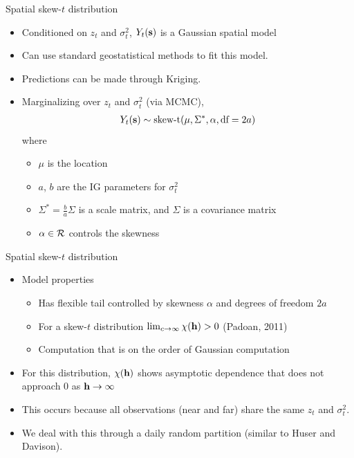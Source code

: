 \documentclass{beamer}
\begin{document}
\begin{frame}{Spatial skew-$t$ distribution}
  \begin{itemize} \setlength{\itemsep}{0.5em}
   \item \alert{Conditioned} on $z_t$ and $\sigma^2_t$, $Y_t(\mbox{\bf s})$ is a Gaussian spatial model
    \item Can use standard geostatistical methods to fit this model.
    \item Predictions can be made through Kriging.
    \item \alert{Marginalizing} over $z_t$ and $\sigma^2_t$ (via MCMC),
    \begin{align*}
      Y_t(\mbox{\bf s}) \sim \text{skew-t}(\mu, \Sigma^*, \alpha, \text{df}=2a)
    \end{align*}
    where
    \begin{itemize}
    	\item $\mu$ is the location
	\item $a$, $b$ are the IG parameters for $\sigma^2_t$
	\item $\Sigma^* = \frac{ b }{ a } \Sigma$ is a scale matrix, and $\Sigma$ is a \Matern covariance matrix
	\item $\alpha \in {\cal R}$ controls the skewness
    \end{itemize}
  \end{itemize}
\end{frame}

\begin{frame}{Spatial skew-$t$ distribution}
  \begin{itemize} \setlength{\itemsep}{0.5em}
      \item Model properties
    \begin{itemize}
    	\item Has flexible tail controlled by skewness $\alpha$ and degrees of freedom $2a$
    	\item For a skew-$t$ distribution $\lim_{c \rightarrow \infty} \chi(\mbox{\bf h}) > 0$ (Padoan, 2011)
    	\item Computation that is on the order of Gaussian computation
    \end{itemize}
    \item For this distribution, $\chi(\mbox{\bf h})$ shows asymptotic dependence that does not approach 0 as $\mbox{\bf h} \rightarrow \infty$
   \item This occurs because all observations (near and far) share the same $z_t$ and $\sigma_t^2$.
    \item We deal with this through a daily random partition (similar to Huser and Davison).
  \end{itemize}
\end{frame}
\end{document}
